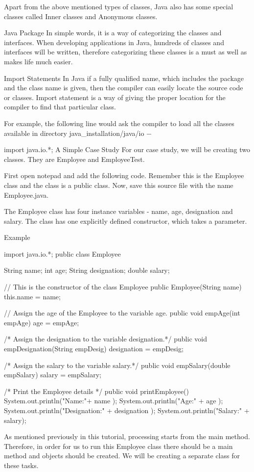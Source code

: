 Apart from the above mentioned types of classes, Java also has some special classes called Inner classes and Anonymous classes.

Java Package
In simple words, it is a way of categorizing the classes and interfaces. When developing applications in Java, hundreds of classes and interfaces will be written, therefore categorizing these classes is a must as well as makes life much easier.

Import Statements
In Java if a fully qualified name, which includes the package and the class name is given, then the compiler can easily locate the source code or classes. Import statement is a way of giving the proper location for the compiler to find that particular class.

For example, the following line would ask the compiler to load all the classes available in directory java_installation/java/io −

import java.io.*;
A Simple Case Study
For our case study, we will be creating two classes. They are Employee and EmployeeTest.

First open notepad and add the following code. Remember this is the Employee class and the class is a public class. Now, save this source file with the name Employee.java.

The Employee class has four instance variables - name, age, designation and salary. The class has one explicitly defined constructor, which takes a parameter.

Example

import java.io.*;
public class Employee {

   String name;
   int age;
   String designation;
   double salary;

   // This is the constructor of the class Employee
   public Employee(String name) {
      this.name = name;
   }

   // Assign the age of the Employee  to the variable age.
   public void empAge(int empAge) {
      age = empAge;
   }

   /* Assign the designation to the variable designation.*/
   public void empDesignation(String empDesig) {
      designation = empDesig;
   }

   /* Assign the salary to the variable salary.*/
   public void empSalary(double empSalary) {
      salary = empSalary;
   }

   /* Print the Employee details */
   public void printEmployee() {
      System.out.println("Name:"+ name );
      System.out.println("Age:" + age );
      System.out.println("Designation:" + designation );
      System.out.println("Salary:" + salary);
   }
}
As mentioned previously in this tutorial, processing starts from the main method. Therefore, in order for us to run this Employee class there should be a main method and objects should be created. We will be creating a separate class for these tasks.

